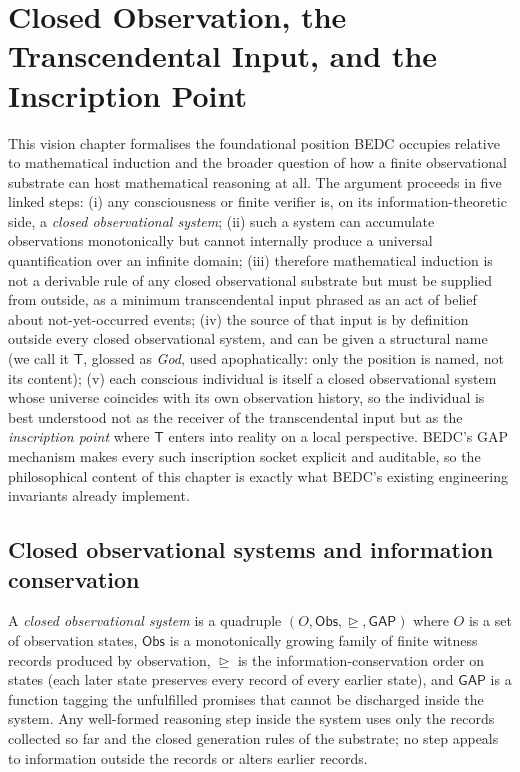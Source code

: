 \chapter{Closed Observation, the Transcendental Input, and the Inscription Point}
\label{ch:visions-transcendental-input-and-induction}

This vision chapter formalises the foundational position BEDC occupies relative to mathematical induction and the broader question of how a finite observational substrate can host mathematical reasoning at all. The argument proceeds in five linked steps: (i) any consciousness or finite verifier is, on its information-theoretic side, a \emph{closed observational system}; (ii) such a system can accumulate observations monotonically but cannot internally produce a universal quantification over an infinite domain; (iii) therefore mathematical induction is not a derivable rule of any closed observational substrate but must be supplied from outside, as a minimum transcendental input phrased as an act of belief about not-yet-occurred events; (iv) the source of that input is by definition outside every closed observational system, and can be given a structural name (we call it $\mathsf{T}$, glossed as \emph{God}, used apophatically: only the position is named, not its content); (v) each conscious individual is itself a closed observational system whose universe coincides with its own observation history, so the individual is best understood not as the receiver of the transcendental input but as the \emph{inscription point} where $\mathsf{T}$ enters into reality on a local perspective. BEDC's GAP mechanism makes every such inscription socket explicit and auditable, so the philosophical content of this chapter is exactly what BEDC's existing engineering invariants already implement.

\section{Closed observational systems and information conservation}
\label{sec:transcendental-input-closed-systems}

\begin{definition}
\label{def:transcendental-input-closed-system}
A \emph{closed observational system} is a quadruple $(O, \mathsf{Obs}, \trianglerighteq, \mathsf{GAP})$ where $O$ is a set of observation states, $\mathsf{Obs}$ is a monotonically growing family of finite witness records produced by observation, $\trianglerighteq$ is the information-conservation order on states (each later state preserves every record of every earlier state), and $\mathsf{GAP}$ is a function tagging the unfulfilled promises that cannot be discharged inside the system. Any well-formed reasoning step inside the system uses only the records collected so far and the closed generation rules of the substrate; no step appeals to information outside the records or alters earlier records.
\end{definition}

